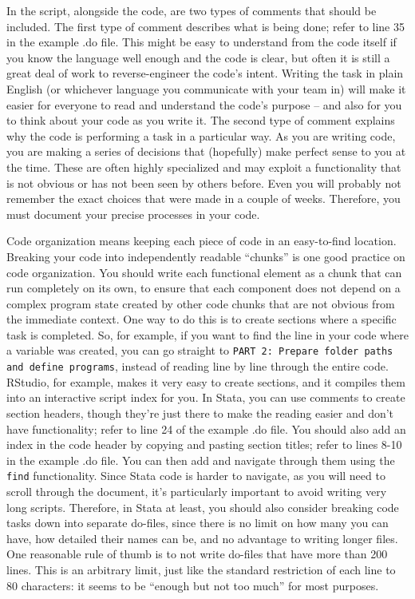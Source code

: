In the script, alongside the code, are two types of comments that should be included.
The first type of comment describes what is being done;
refer to line 35 in the example .do file.
This might be easy to understand from the code itself
if you know the language well enough and the code is clear,
but often it is still a great deal of work to reverse-engineer the code's intent.
Writing the task in plain English (or whichever language you communicate with your team in)
will make it easier for everyone to read and understand the code's purpose
-- and also for you to think about your code as you write it.
The second type of comment explains why the code is performing a task in a particular way.
As you are writing code, you are making a series of decisions that
(hopefully) make perfect sense to you at the time.
These are often highly specialized and may exploit a functionality
that is not obvious or has not been seen by others before.
Even you will probably not remember the exact choices that were made in a couple of weeks.
Therefore, you must document your precise processes in your code.

Code organization means keeping each piece of code in an easy-to-find location.
Breaking your code into independently readable ``chunks'' is one good practice on code organization.
You should write each functional element as a chunk that can run completely on its own,
to ensure that each component does not depend on a complex program state
created by other code chunks that are not obvious from the immediate context.
One way to do this is to create sections where a specific task is completed.
So, for example, if you want to find the line in your code where a variable was created,
you can go straight to \texttt{PART 2: Prepare folder paths and define programs},
instead of reading line by line through the entire code.
RStudio, for example, makes it very easy to create sections,
and it compiles them into an interactive script index for you.
In Stata, you can use comments to create section headers,
though they're just there to make the reading easier and don't have functionality;
refer to line 24 of the example .do file.
You should also add an index in the code header by copying and pasting section titles;
refer to lines 8-10 in the example .do file.
You can then add and navigate through them using the \texttt{find} functionality.
Since Stata code is harder to navigate, as you will need to scroll through the document,
it's particularly important to avoid writing very long scripts.
Therefore, in Stata at least, you should also consider breaking code tasks down
into separate do-files, since there is no limit on how many you can have,
how detailed their names can be, and no advantage to writing longer files.
One reasonable rule of thumb is to not write do-files that have more than 200 lines.
This is an arbitrary limit, just like the standard restriction of each line to 80 characters:
it seems to be ``enough but not too much'' for most purposes.

